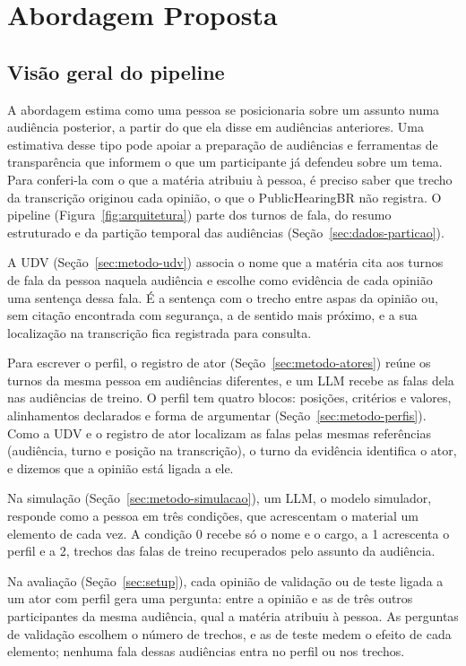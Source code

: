 \section{Abordagem Proposta}
\label{sec:metodo}

\subsection{Visão geral do pipeline}
\label{sec:metodo-visao}



A abordagem estima como uma pessoa se posicionaria sobre um assunto numa audiência posterior, a
partir do que ela disse em audiências anteriores. Uma estimativa
desse tipo pode apoiar a preparação de audiências e ferramentas de transparência que informem o que
um participante já defendeu sobre um tema. Para conferi-la com o que a matéria atribuiu à pessoa, é
preciso saber que trecho da transcrição originou cada opinião, o que o PublicHearingBR não registra.
O pipeline (Figura~\ref{fig:arquitetura}) parte dos turnos de fala, do resumo estruturado e da
partição temporal das audiências (Seção~\ref{sec:dados-particao}).

A UDV (Seção~\ref{sec:metodo-udv}) associa o nome que a matéria cita aos turnos de fala da pessoa
naquela audiência e escolhe como evidência de cada opinião uma sentença dessa fala. É a sentença com
o trecho entre aspas da opinião ou, sem citação encontrada com segurança, a de sentido mais próximo, e
a sua localização na transcrição fica registrada para consulta.

Para escrever o perfil, o registro de ator (Seção~\ref{sec:metodo-atores}) reúne os turnos da mesma
pessoa em audiências diferentes, e um LLM recebe as falas dela nas audiências de treino. O perfil tem
quatro blocos: posições, critérios e valores, alinhamentos declarados e forma de argumentar
(Seção~\ref{sec:metodo-perfis}). Como a UDV e o registro de ator localizam as falas pelas mesmas
referências (audiência, turno e posição na transcrição), o turno da evidência identifica o ator, e
dizemos que a opinião está ligada a ele.

Na simulação (Seção~\ref{sec:metodo-simulacao}), um LLM, o modelo simulador, responde como a pessoa
em três condições, que acrescentam o material um elemento de cada vez. A condição 0 recebe só o
nome e o cargo, a 1 acrescenta o perfil e a 2, trechos das falas de treino recuperados pelo assunto
da audiência.

Na avaliação (Seção~\ref{sec:setup}), cada opinião de validação ou de teste ligada a um ator com
perfil gera uma pergunta: entre a opinião e as de três outros participantes da mesma audiência, qual
a matéria atribuiu à pessoa. As perguntas de validação escolhem o número de trechos, e as de teste
medem o efeito de cada elemento; nenhuma fala dessas audiências entra no perfil ou nos trechos.


